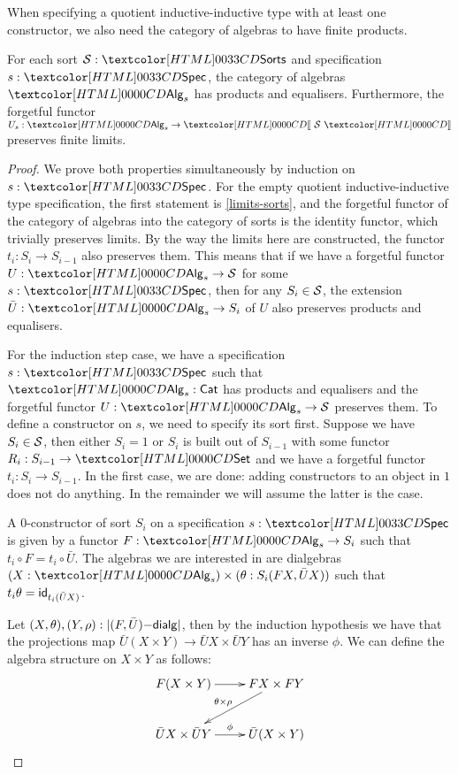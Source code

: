 When specifying a quotient inductive-inductive type with at least one
constructor, we also need the category of algebras to have finite
products.

\begin{lemma}
  For each sort $\Ss : \sortsty$ and specification $s : \specty$, the
  category of algebras $\Alg_s$ has products and
  equalisers. Furthermore, the forgetful functor
  $U_s : \Alg_s \to \SortCat{\Ss}$ preserves finite limits.
\end{lemma}
\begin{proof}
  We prove both properties simultaneously by induction on
  $s : \specty$.  For the empty quotient inductive-inductive type
  specification, the first statement is \cref{limits-sorts}, and the
  forgetful functor of the category of algebras into the category of
  sorts is the identity functor, which trivially preserves limits. By
  the way the limits here are constructed, the functor
  $t_i : S_i \to S_{i-1}$ also preserves them. This means that if we
  have a forgetful functor $U : \Alg_s \to \Ss$ for some
  $s : \specty$, then for any $S_i \in \mathcal{S}$, the extension
  $\bar{U} : \Alg_s \to S_i$ of $U$ also preserves products and
  equalisers.

  For the induction step case, we have a specification $s : \specty$
  such that $\Alg_s : \Cat$ has products and equalisers and the
  forgetful functor $U : \Alg_s \to \Ss$ preserves them. To define a
  constructor on $s$, we need to specify its sort first. Suppose we
  have $S_i \in \mathcal{S}$, then either $S_i = 1$ or $S_i$ is built out of
  $S_{i-1}$ with some functor $R_i : S_{i-1} \to \Set$ and we have a
  forgetful functor $t_i : S_i \to S_{i-1}$. In the first case, we are
  done: adding constructors to an object in $1$ does not do
  anything. In the remainder we will assume the latter is the case.

  A 0-constructor of sort $S_i$ on a specification $s : \specty$ is
  given by a functor $F : \Alg_s \to S_i$ such that
  $t_i \circ F = t_i \circ \bar{U}$. The algebras we are interested in
  are dialgebras $(X : \Alg_s) \times (\theta : S_i(FX, \bar{U}X))$
  such that $t_i \theta = \mathsf{id}_{t_i (\bar{U}X)}$.

  Let $(X,\theta), (Y,\rho) : | (F,\bar{U})\mathsf{-dialg} |$, then by the
  induction hypothesis we have that the projections map
  $\bar{U}(X \times Y) \to \bar{U}X \times \bar{U}Y$ has an inverse
  $\phi$. We can define the algebra structure on $X \times Y$ as
  follows:
  $$
  \xymatrix{ F(X \times Y) \ar[r] &
    FX \times FY \ar[ld]_{\theta \times \rho} \\
    \bar{U}X \times \bar{U}Y \ar[r]^{\phi} & \bar{U}(X \times Y) }
  $$


\end{proof}
